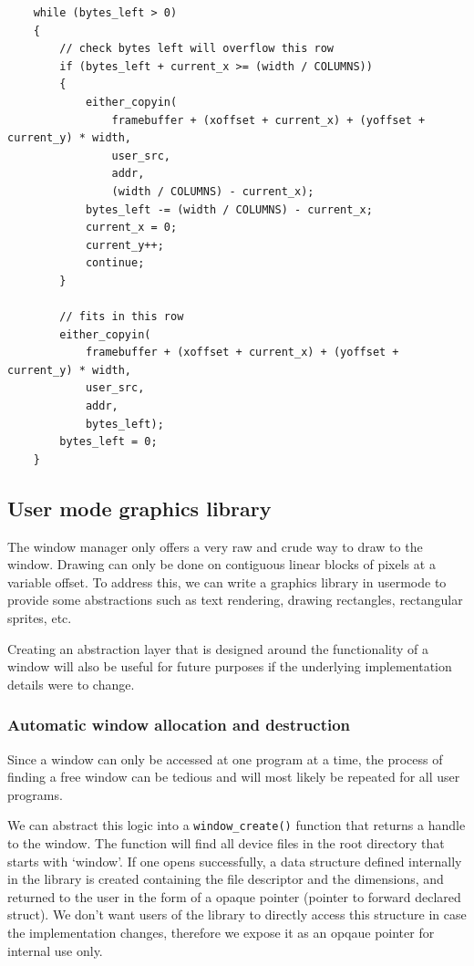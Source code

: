 \begin{verbatim}
    while (bytes_left > 0)
    {
        // check bytes left will overflow this row
        if (bytes_left + current_x >= (width / COLUMNS))
        {
            either_copyin(
                framebuffer + (xoffset + current_x) + (yoffset + current_y) * width,
                user_src,
                addr,
                (width / COLUMNS) - current_x);
            bytes_left -= (width / COLUMNS) - current_x;
            current_x = 0;
            current_y++;
            continue;
        }

        // fits in this row
        either_copyin(
            framebuffer + (xoffset + current_x) + (yoffset + current_y) * width,
            user_src,
            addr,
            bytes_left);
        bytes_left = 0;
    }
\end{verbatim}

\subsection{User mode graphics library}
\label{chapter2:impl:usrlib}

The window manager only offers a very raw and crude way to draw to the window.
Drawing can only be done on contiguous linear blocks of pixels at a variable offset.
To address this, we can write a graphics library in usermode to provide some 
abstractions such as text rendering, drawing rectangles, rectangular sprites, etc.

Creating an abstraction layer that is designed around the functionality of a window
will also be useful for future purposes if the underlying implementation details were to
change. 

\subsubsection{Automatic window allocation and destruction}
Since a window can only be accessed at one program at a time, the process of finding
a free window can be tedious and will most likely be repeated for all user programs.

We can abstract this logic into a \texttt{window_create()} function that
returns a handle to the window. The function will find all device files in the
root directory that starts with `window'. If one opens successfully, a data structure
defined internally in the library is created containing the file descriptor
and the dimensions, and returned to the user in the form of a opaque pointer
(pointer to forward declared struct).
We don't want users of the library to directly access this structure in case
the implementation changes, therefore we expose it as an opqaue pointer
for internal use only.

